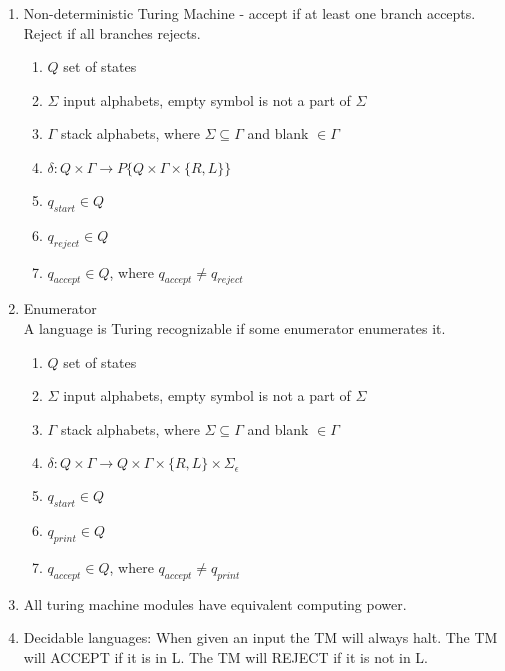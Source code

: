 \documentclass{article}
\newcommand\curl[1]{\{#1\}}
\begin{document}
\begin{enumerate}[1., leftmargin = 0.5cm]
    \item Non-deterministic Turing Machine - accept if at least one branch accepts. Reject if all branches rejects.
        \begin{enumerate}[1., leftmargin = 0.5cm]
        \itemsep0em
        \item $Q$ set of states
        \item $\Sigma$ input alphabets, empty symbol is not a part of $\Sigma$
        \item $\Gamma$ stack alphabets, where $\Sigma \subseteq \Gamma$ and blank $\in \Gamma$
        \item $\delta : Q \times \Gamma \rightarrow P \curl{Q \times \Gamma \times \curl{R,L}}$
        \item $q_{start} \in Q$
        \item $q_{reject} \in Q$
        \item $q_{accept} \in Q$, where $q_{accept} \ne q_{reject}$
        \end{enumerate}

    \item Enumerator \\
        A language is Turing recognizable if some enumerator enumerates it.
        \begin{enumerate}[1., leftmargin = 0.5cm]
        \itemsep0em
        \item $Q$ set of states
        \item $\Sigma$ input alphabets, empty symbol is not a part of $\Sigma$
        \item $\Gamma$ stack alphabets, where $\Sigma \subseteq \Gamma$ and blank $\in \Gamma$
        \item $\delta : Q \times \Gamma \rightarrow Q \times \Gamma \times \curl{R,L} \times \Sigma_{\epsilon}$
        \item $q_{start} \in Q$
        \item $q_{print} \in Q$
        \item $q_{accept} \in Q$, where $q_{accept} \ne q_{print}$
        \end{enumerate}
    
    \item All turing machine modules have equivalent computing power.

    \item Decidable languages: When given an input the TM will always halt. The TM will ACCEPT if it is in L.
        The TM will REJECT if it is not in L.


\end{enumerate}
\end{document}
